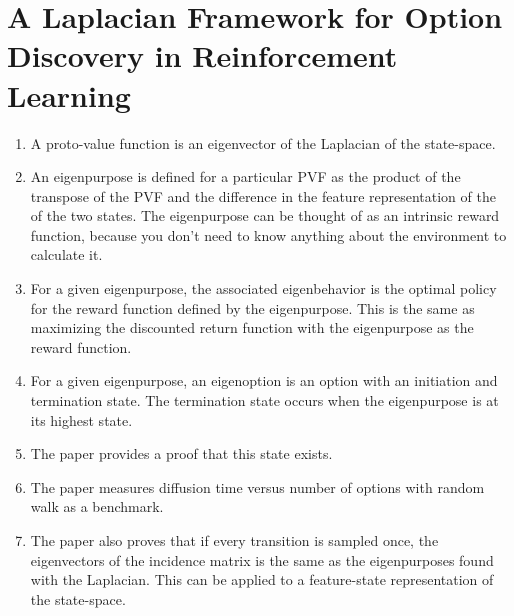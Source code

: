 \documentclass{article}
\begin{document}
\section{A Laplacian Framework for Option Discovery in Reinforcement Learning}
\begin{enumerate}
\item A proto-value function is an eigenvector of the Laplacian of the state-space.
\item An eigenpurpose is defined for a particular PVF as the product of the transpose of the PVF and the difference in the feature representation of the of the two states. The eigenpurpose can be thought of as an intrinsic reward function, because you don’t need to know anything about the environment to calculate it.
\item For a given eigenpurpose, the associated eigenbehavior is the optimal policy for the reward function defined by the eigenpurpose. This is the same as maximizing the discounted return function with the eigenpurpose as the reward function.
\item For a given eigenpurpose, an eigenoption is an option with an initiation and termination state. The termination state occurs when the eigenpurpose is at its highest state. \item The paper provides a proof that this state exists.
\item The paper measures diffusion time versus number of options with random walk as a benchmark.
\item The paper also proves that if every transition is sampled once, the eigenvectors of the incidence matrix is the same as the eigenpurposes found with the Laplacian. This can be applied to a feature-state representation of the state-space.

\end{enumerate}
\end{document}
